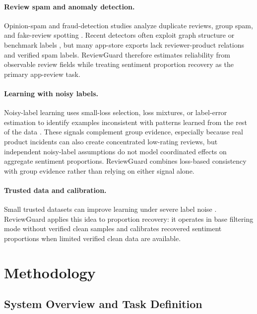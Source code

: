 \documentclass[runningheads]{llncs}
\begin{document}
\paragraph{Review spam and anomaly detection.}
Opinion-spam and fraud-detection studies analyze duplicate reviews, group spam, and fake-review spotting \cite{jindal2008opinion,mukherjee2013spotting,li2014spotting}. Recent detectors often exploit graph structure or benchmark labels \cite{rayana2015collective,dou2020caregnn,liu2021pcgnn,wu2023splitgnn}, but many app-store exports lack reviewer-product relations and verified spam labels. ReviewGuard therefore estimates reliability from observable review fields while treating sentiment proportion recovery as the primary app-review task.

\paragraph{Learning with noisy labels.}
Noisy-label learning uses small-loss selection, loss mixtures, or label-error estimation to identify examples inconsistent with patterns learned from the rest of the data \cite{han2018coteaching,wei2020jocor,li2020dividemix,tan2021colearning,wei2021noisylabels,song2022survey,northcutt2021confident}. These signals complement group evidence, especially because real product incidents can also create concentrated low-rating reviews, but independent noisy-label assumptions do not model coordinated effects on aggregate sentiment proportions. ReviewGuard combines loss-based consistency with group evidence rather than relying on either signal alone.

\paragraph{Trusted data and calibration.}
Small trusted datasets can improve learning under severe label noise \cite{hendrycks2018trusted}. ReviewGuard applies this idea to proportion recovery: it operates in base filtering mode without verified clean samples and calibrates recovered sentiment proportions when limited verified clean data are available.

\section{Methodology}

\subsection{System Overview and Task Definition}
\end{document}
